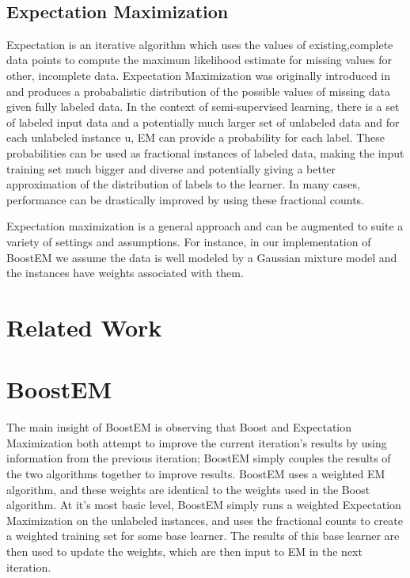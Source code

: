 \documentclass{sig-alternate}
\begin{document}
~\cite{Freund:1997:DGO:261540.261549}

\subsection{Expectation Maximization}
Expectation is an iterative algorithm which uses the values of existing,complete data points to compute the maximum likelihood estimate for missing values for other, incomplete data. Expectation Maximization was originally introduced in ~\cite{Dempster77maximumlikelihood} and produces a probabalistic distribution of the possible values of missing data given fully labeled data. In the context of semi-supervised learning, there is a set of labeled input data and a potentially much larger set of unlabeled data and for each unlabeled instance u, EM can provide a probability for each label.  These probabilities can be used as fractional instances of labeled data, making the input training set much bigger and diverse and potentially giving a better approximation of the distribution of labels to the learner. In many cases, performance can be drastically improved by using these fractional counts.

Expectation maximization is a general approach and can be augmented to suite a variety of settings and assumptions.  For instance, in our implementation of BoostEM we assume the data is well modeled by a Gaussian mixture model and the instances have weights associated with them.    

     
\section{Related Work}
\section{BoostEM}
The main insight of BoostEM is observing that Boost and Expectation Maximization both attempt to improve the current iteration's results by using information from the previous iteration; BoostEM simply couples the results of the two algorithms together to improve results.  BoostEM uses a weighted EM algorithm, and these weights are identical to the weights used in the Boost algorithm.  At it's most basic level, BoostEM simply runs a weighted Expectation Maximization on the unlabeled instances, and uses the fractional counts to create a weighted training set for some base learner.  The results of this base learner are then used to update the weights, which are then input to EM in the next iteration.
\end{document}
